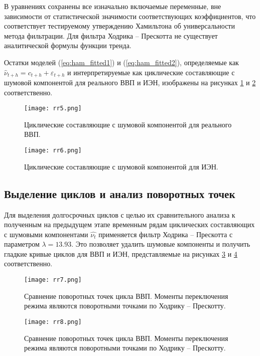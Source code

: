 \documentclass[a4paper,14pt]{extreport}
\begin{document}
	В уравнениях сохранены все изначально включаемые переменные, вне зависимости от статистической значимости соответствующих коэффициентов, что соответствует тестируемому утверждению Хамильтона об универсальности метода фильтрации. Для фильтра Ходрика -- Прескотта не существует аналитической формулы функции тренда.

	Остатки моделей (\ref{eq:ham_fitted1}) и (\ref{eq:ham_fitted2}), определяемые как $\hat{\nu}_{t+h} = c_{t+h} + \varepsilon_{t+h}$ и интерпретируемые как циклические составляющие с шумовой компонентой для реального ВВП и ИЭН, изображены на рисунках \ref{fig:rr5} и \ref{fig:rr6} соответственно.
	
	\begin{figure}
		\texttt{[image: rr5.png]}
		\caption{
			Циклические составляющие с шумовой компонентой для реального ВВП.
		}
		\label{fig:rr5}
	\end{figure}	
	
	\begin{figure}
		\texttt{[image: rr6.png]}
		\caption{
			Циклические составляющие с шумовой компонентой для ИЭН.
		}
		\label{fig:rr6}
	\end{figure}	

	\subsection{Выделение циклов и анализ поворотных точек}
	
	Для выделения долгосрочных циклов с целью их сравнительного анализа к полученным на предыдущем этапе временным рядам  циклических составляющих с шумовыми компонентами $\hat{\nu_t}$ применяется фильтр Ходрика -- Прескотта с параметром  $\lambda=13.93$. Это позволяет удалить шумовые компоненты и получить гладкие кривые циклов для ВВП и ИЭН, представляемые на рисунках \ref{fig:rr7} и \ref{fig:rr8} соответственно. 
	
	
	\begin{figure}
		\texttt{[image: rr7.png]}
		\caption{
			Сравнение поворотных точек цикла ВВП. Моменты переключения режима являются поворотными точками по Ходрику -- Прескотту. 
		}
		\label{fig:rr7}
	\end{figure}	
	
	\begin{figure}
		\texttt{[image: rr8.png]}
		\caption{
			Сравнение поворотных точек цикла ВВП. Моменты переключения режима являются поворотными точками по Ходрику -- Прескотту.
		}
		\label{fig:rr8}
	\end{figure}	
	
\end{document}
